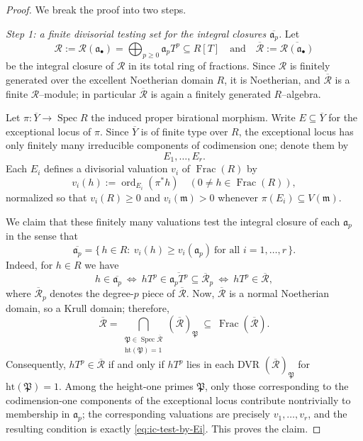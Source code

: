 \documentclass[12pt]{amsart}
\newcommand{\m}{\mathfrak m}
\newcommand{\ord}{\operatorname{\mathrm{ord}}}
\renewcommand{\a}{\mathfrak{a}}
\newcommand{\R}{\mathcal{R}}
\DeclareMathOperator{\Frac}{Frac}
\DeclareMathOperator{\Spec}{Spec}
\newcommand{\abul}{{\a_\bullet}}
\theoremstyle{plain}
\theoremstyle{definition}
\numberwithin{equation}{section}
\begin{document}
\begin{proof}
	We break the proof into two steps.
	
	\smallskip
	\noindent\textit{Step 1: a finite divisorial testing set for the integral closures
		$\overline{\a_p}$.}
	Let
	\[
	\R:=\R(\abul)=\bigoplus_{p\ge 0}\a_pT^p
	\subseteq R[T]
	\quad\text{and}\quad
	\overline{\R}:=\overline{\R(\abul)}
	\]
	be the integral closure of $\R$ in its total ring of fractions.
	Since $\R$ is finitely generated over the excellent Noetherian domain $R$, it is Noetherian,
	and $\overline{\R}$ is a finite $\R$--module; in particular
	$\overline{\R}$ is again a finitely generated $R$--algebra.
	
	Let $\pi:\overline{Y}\to \Spec R$ the induced proper birational morphism.
	Write $E\subseteq \overline{Y}$ for the exceptional locus of $\pi$.
	Since $\overline{Y}$ is of finite type over $R$, the exceptional locus has only finitely many
	irreducible components of codimension one; denote them by
	\[
	E_1,\dots,E_r.
	\]
	Each $E_i$ defines a divisorial valuation $v_i$ of $\Frac(R)$ by
	\[
	v_i(h):=\ord_{E_i}(\pi^*h)\quad (0\ne h\in \Frac(R)),
	\]
	normalized so that $v_i(R)\ge 0$ and $v_i(\m)>0$ whenever $\pi(E_i)\subseteq V(\m)$.
	
	We claim that these finitely many valuations test the integral closure of each
	$\a_p$ in the sense that
	\begin{equation}\label{eq:ic-test-by-Ei}
		\overline{\a_p}
		=
		\{\,h\in R:\ v_i(h)\ge v_i(\a_p)\ \text{for all } i=1,\dots,r\,\}.
	\end{equation}
	Indeed, for $h\in R$ we have
	\[
	h\in \overline{\a_p}
	\ \Longleftrightarrow\
	hT^p \in \overline{\a_pT^p}\subseteq \overline{\R}_p
	\ \Longleftrightarrow\
	hT^p \in \overline{\R},
	\]
	where $\overline{\R}_p$ denotes the degree-$p$ piece of $\overline{\R}$.
	Now, $\overline{\R}$ is a normal Noetherian domain, so a Krull domain; therefore,
	\[
	\overline{\R}
	=
	\bigcap_{\substack{\mathfrak P\in \Spec \overline{\R}\\ \mathrm{ht}(\mathfrak P)=1}}
	(\overline{\R})_{\mathfrak P}
	\ \subseteq\ \Frac(\overline{\R}).
	\]
	Consequently, $hT^p\in \overline{\R}$ if and only if $hT^p$ lies in each DVR
	$(\overline{\R})_{\mathfrak P}$ for $\mathrm{ht}(\mathfrak P)=1$.
	Among the height-one primes $\mathfrak P$, only those corresponding to the codimension-one
	components of the exceptional locus contribute nontrivially to membership in $\a_p$; the
	corresponding valuations are precisely $v_1,\dots,v_r$, and the resulting condition is
	exactly \eqref{eq:ic-test-by-Ei}.  This proves the claim.
	

\end{proof}
\end{document}
